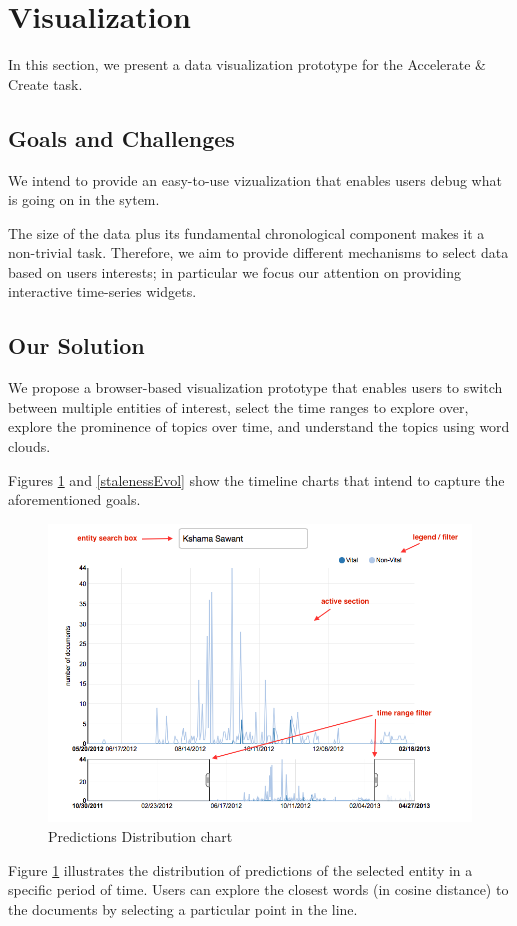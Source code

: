 \documentclass{article}
\begin{document}
{{\section{Visualization}

In this section, we present a data visualization prototype for the Accelerate \& Create task.

\subsection{Goals and Challenges}

We intend to provide an easy-to-use vizualization that enables users debug what is going on in the sytem. 

The size of the data plus its fundamental chronological component makes it a non-trivial task. Therefore, we aim to provide different mechanisms to select data based on users interests; in particular we focus our attention on providing interactive time-series widgets.

\subsection{Our Solution}

We propose a browser-based visualization prototype that enables users to switch between multiple entities of interest, select the time ranges to explore over, explore the prominence of topics over time, and understand the topics using word clouds.

Figures \ref{vitalEvol} and \ref{stalenessEvol} show the timeline charts that intend to capture the aforementioned goals.

\begin{figure}[h!]
\centering
\includegraphics[width=.5\textwidth]{fig/vitalDistribution.png}
\caption{Predictions Distribution chart}
\label{vitalEvol}
\end{figure}

Figure \ref{vitalEvol} illustrates the distribution of predictions of the selected entity in a specific period of time. Users can explore the closest words (in cosine distance) to the documents by selecting a particular point in the line.

}}
\end{document}
